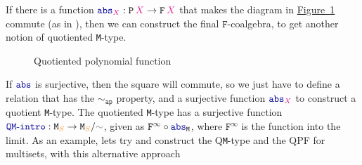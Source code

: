 \documentclass[twoside,11pt,openright]{report}
\theoremstyle{plain} %
\theoremstyle{definition}
\theoremstyle{remark}
\newcommand*{\figref}[1]{\hyperref[fig:#1]{Figure~\ref*{fig:#1}}}
\newcommand*{\type}[1]{\textcolor{magenta!90!black}{#1}}
\newcommand*{\container}[1]{\textcolor{orange}{#1}}
\newcommand*{\relation}[1]{\textcolor{gray!75!black}{\ensuremath{\mathtt{#1}}}}
\newcommand*{\function}[1]{\textcolor{blue!60!black}{\ensuremath{\mathtt{#1}}}}
\newcommand*{\typeformer}[1]{\ensuremath{\mathtt{#1}}}
\newcommand*{\functor}[1]{\ensuremath{\mathbf{\mathtt{#1}}}}
\begin{document}
\noindent If there is a function \(\function{abs}_{\type{X}} : \functor{P}\,\type{X} \rightarrow \functor{F}\,\type{X}\) that makes the diagram in \figref{QPF-diagram} commute (as in \cite{DBLP:QM-lean}), then we can construct the final \(\functor{F}\)-coalgebra, to get another notion of quotiented \texttt{M}-type.
\begin{figure}[h]
  \centering
  \caption{Quotiented polynomial function}
  \label{fig:QPF-diagram}
\end{figure}
If \(\function{abs}\) is surjective, then the square will commute, so we just have to define a relation that has the \function{\sim_{ap}} property, and a surjective function \(\function{abs}_{\type{X}}\) to construct a quotient \texttt{M}-type. The quotiented \texttt{M}-type has a surjective function \(\function{QM\text{-}intro} : \typeformer{M}_{\container{S}} \rightarrow \typeformer{M}_{\container{S}} / \relation{\sim}\), given as \(\functor{F}^{\infty} \circ \function{abs}_{\typeformer{M}}\), where \(\functor{F}^\infty\) is the function into the limit. As an example, lets try and construct the Q\texttt{M}-type and the QPF for multisets, with this alternative approach
\end{document}
